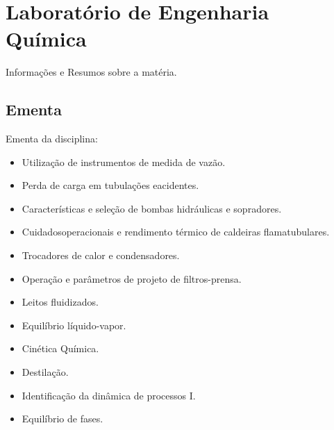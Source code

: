 \chapter{Laboratório de Engenharia Química}

Informações e Resumos sobre a matéria.

\section{Ementa}

Ementa da disciplina:


\begin{itemize}


\item Utilização de instrumentos de medida de vazão. 
\item Perda de carga em tubulações eacidentes. 
\item Características e seleção de bombas hidráulicas e sopradores. 
\item Cuidadosoperacionais e rendimento térmico de caldeiras flamatubulares. 
\item Trocadores de calor e condensadores. 
\item Operação e parâmetros de projeto de filtros-prensa. 
\item Leitos fluidizados. 
\item Equilíbrio líquido-vapor. 
\item Cinética Química. 
\item Destilação. 
\item Identificação da dinâmica de processos I. 
\item Equilíbrio de fases.



\end{itemize}




